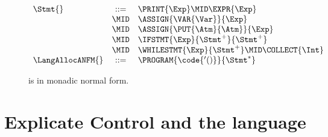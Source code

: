 \documentclass[7x10]{TimesAPriori_MIT}%
\begin{document}
\begin{figure}[tp]
{\begin{minipage}{0.96\textwidth}
{\[\begin{array}{lcl}
\Stmt{} &::=& \PRINT{\Exp} \MID \EXPR{\Exp} \\
  &\MID& \ASSIGN{\VAR{\Var}}{\Exp} \\
  &\MID& \ASSIGN{\PUT{\Atm}{\Atm}}{\Exp} \\
  &\MID& \IFSTMT{\Exp}{\Stmt^{+}}{\Stmt^{+}}\\
  &\MID& \WHILESTMT{\Exp}{\Stmt^{+}}
   \MID \COLLECT{\Int}  \\
\LangAllocANFM{} &::=& \PROGRAM{\code{'()}}{\Stmt^{*}}
\end{array}
\]
\fi}
\end{minipage}
}
\caption{\LangAllocANF{} is \LangAlloc{} in monadic normal form.}
\label{fig:Lvec-anf-syntax}
\end{figure}


\section{Explicate Control and the \LangCVec{} language}
\label{sec:explicate-control-r3}

\newcommand{\CtupASTPython}{
\begin{array}{lcl}
\Exp &::= & \GET{\Atm}{\Atm}\MID \ALLOCATE{\Int}{\Type} \\
      &\MID& \GLOBALVALUE{\Var}\RP \MID \LEN{\Atm} \\
\Stmt &::=& \COLLECT{\Int} \\
     &\MID& \ASSIGN{\PUT{\Atm}{\Atm}}{\Atm} 
\end{array}
}
\end{document}
